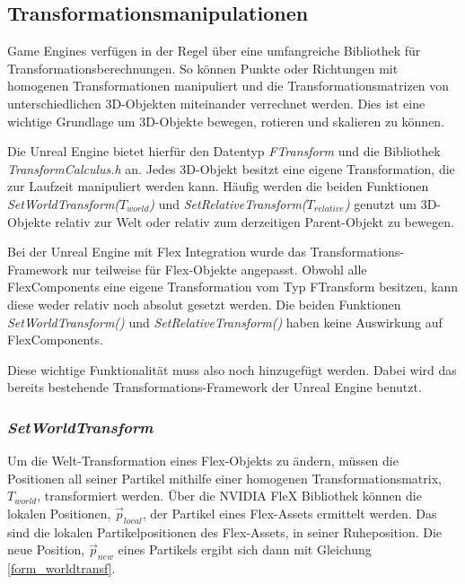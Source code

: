 

\subsection{Transformationsmanipulationen}


Game Engines verfügen in der Regel über eine umfangreiche Bibliothek für Transformationsberechnungen. So können Punkte oder Richtungen mit homogenen Transformationen manipuliert und die Transformationsmatrizen von unterschiedlichen 3D-Objekten miteinander verrechnet werden.
Dies ist eine wichtige Grundlage um 3D-Objekte bewegen, rotieren und skalieren zu können. 

Die Unreal Engine bietet hierfür den Datentyp \textit{FTransform} und die Bibliothek \textit{TransformCalculus.h} an. Jedes 3D-Objekt besitzt eine eigene Transformation, die zur Laufzeit manipuliert werden kann. Häufig werden die beiden Funktionen \textit{SetWorldTransform($T_{world}$)} und \textit{SetRelativeTransform($T_{relative}$)} genutzt um 3D-Objekte relativ zur Welt oder relativ zum derzeitigen Parent-Objekt zu bewegen.

Bei der Unreal Engine mit Flex Integration wurde das Transformations-Framework nur teilweise für Flex-Objekte angepasst. Obwohl alle FlexComponents eine eigene Transformation vom Typ FTransform besitzen, kann diese weder relativ noch absolut gesetzt werden. Die beiden Funktionen \textit{SetWorldTransform()} und \textit{SetRelativeTransform()} haben keine Auswirkung auf FlexComponents.

Diese wichtige Funktionalität muss also noch hinzugefügt werden. Dabei wird das bereits bestehende Transformations-Framework der Unreal Engine benutzt.

\subsubsection{\textit{SetWorldTransform}}

Um die Welt-Transformation eines Flex-Objekts zu ändern, müssen die Positionen all seiner Partikel mithilfe einer homogenen Transformationsmatrix, $T_{world}$, transformiert werden. Über die NVIDIA FleX Bibliothek können die lokalen Positionen, $\vec{p}_{local}$, der Partikel eines Flex-Assets 
ermittelt werden. Das sind die lokalen Partikelpositionen des Flex-Assets, in seiner Ruheposition. Die neue Position, $\vec{p}_{new}$ eines Partikels ergibt sich dann mit Gleichung \ref{form_worldtransf}.


